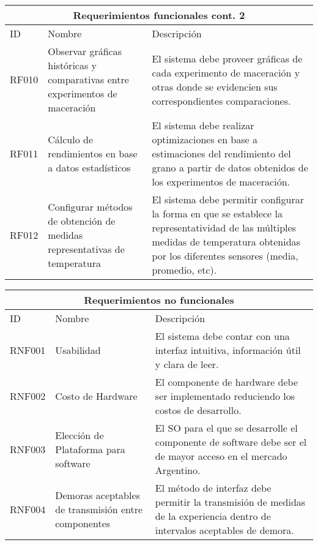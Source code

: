     \begin{minipage}{0.95\textwidth}
    \begin{center}
    \begin{tabularx}{\textwidth}{| X | X | X |}
    \hline
    \multicolumn{3}{|c|}{\textbf{Requerimientos funcionales cont. 2}} \\
    \hline
    ID & Nombre & Descripción \\
    \hline
    \hline
         RF010 & Observar gráficas históricas y comparativas entre experimentos de maceración & El sistema debe proveer gráficas de cada experimento de maceración y otras donde se evidencien sus correspondientes comparaciones. \\\hline
         RF011 & Cálculo de rendimientos en base a datos estadísticos & El sistema debe realizar optimizaciones en base a estimaciones del rendimiento del grano a partir de datos obtenidos de los experimentos de maceración.
         \\\hline
         RF012 & Configurar métodos de obtención de medidas representativas de temperatura & El sistema debe permitir configurar la forma en que se establece la representatividad de las múltiples medidas de temperatura obtenidas por los diferentes sensores (media, promedio, etc).
     \\\hline
    \end{tabularx}
    \label{ReqFuncionales_Parte3}
    \end{center}
    \end{minipage}
    
    \begin{minipage}{0.95\textwidth}
    \begin{center}
    \begin{tabularx}{\textwidth}{| X | X | X |}
    \hline
    \multicolumn{3}{|c|}{\textbf{Requerimientos no funcionales}} \\
    \hline
    ID & Nombre & Descripción \\
    \hline
    \hline
         RNF001 & Usabilidad & El sistema debe contar con una interfaz intuitiva, información útil y clara de leer. \\\hline
         RNF002 & Costo de Hardware & El componente de hardware debe ser implementado reduciendo los costos de desarrollo.
         \\\hline
         RNF003 & Elección de Plataforma para software & El SO para el que se desarrolle el componente de software debe ser el de mayor acceso en el mercado Argentino.
         \\\hline
         RNF004 & Demoras aceptables de transmisión entre componentes & El método de interfaz debe permitir la transmisión de medidas de la experiencia dentro de intervalos aceptables de demora.
         \\\hline
    \end{tabularx}
    \label{ReqNoFuncionales_Parte1}
    \end{center}
    \end{minipage}    
         

